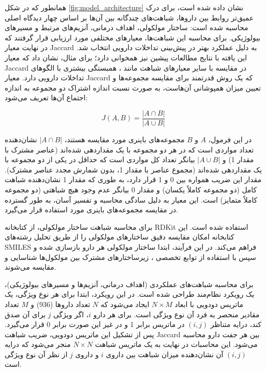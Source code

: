 همانطور که در شکل \ref{fig:model_architecture} نشان داده شده است، برای درک عمیق‌تر روابط بین داروها، شباهت‌های چندگانه بین آن‌ها بر اساس چهار دیدگاه اصلی محاسبه شده است: ساختار مولکولی، اهداف درمانی، آنزیم‌های مرتبط و مسیرهای بیولوژیکی. برای محاسبه این شباهت‌ها، معیارهای مختلفی مورد ارزیابی قرار گرفتند که در نهایت معیار Jaccard به دلیل عملکرد بهتر در پیش‌بینی تداخلات دارویی انتخاب شد. این یافته با نتایج مطالعات پیشین نیز همخوانی دارد؛ برای مثال، \cite{ref_kumari2024} نشان داد که معیار Jaccard در مقایسه با سایر معیارهای شباهت مانند ، همبستگی بیشتری با الگوهای تداخلات دارویی دارد. معیار Jaccard که یک روش قدرتمند برای مقایسه مجموعه‌ها و تعیین میزان همپوشانی آن‌هاست، به صورت نسبت اندازه اشتراک دو مجموعه به اندازه اجتماع آن‌ها تعریف می‌شود:

\begin{equation}
	J(A,B) = \frac{|A \cap B|}{|A \cup B|}
\end{equation}

در این فرمول، $A$ و $B$ مجموعه‌های باینری مورد مقایسه هستند، $|A \cap B|$ نشان‌دهنده تعداد مواردی است که در هر دو مجموعه با یک مقداردهی شده‌اند (عناصر مشترک با مقدار 1) و $|A \cup B|$ بیانگر تعداد کل مواردی است که حداقل در یکی از دو مجموعه با یک مقداردهی شده‌اند (مجموع عناصر با مقدار 1، بدون شمارش مجدد عناصر مشترک). مقدار این ضریب همواره بین 0 و 1 قرار دارد، به طوری که مقدار 1 نشان‌دهنده شباهت کامل (دو مجموعه کاملاً یکسان) و مقدار 0 بیانگر عدم وجود هیچ شباهتی (دو مجموعه کاملاً متمایز) است. این معیار به دلیل سادگی محاسبه و تفسیر آسان، به طور گسترده در مقایسه مجموعه‌های باینری مورد استفاده قرار می‌گیرد.

برای محاسبه شباهت ساختار مولکولی، از کتابخانه RDKit استفاده شده است. این کتابخانه امکان مقایسه دقیق ساختارهای مولکولی را از طریق تحلیل رشته‌های SMILES فراهم می‌کند. در این فرآیند، ابتدا ساختار مولکولی هر دارو بازسازی شده و سپس با استفاده از توابع تخصصی ، زیرساختارهای مشترک بین مولکول‌ها شناسایی و مقایسه می‌شوند.

برای محاسبه شباهت‌های عملکردی (اهداف درمانی، آنزیم‌ها و مسیرهای بیولوژیکی)، یک رویکرد نظام‌مند طراحی شده است. در این رویکرد، ابتدا برای هر نوع ویژگی، یک ماتریس دودویی با ابعاد $N \times M$ ایجاد می‌شود که $N$ تعداد داروها (936) و $M$ تعداد مقادیر منحصر به فرد آن نوع ویژگی است. برای هر دارو $i$، اگر ویژگی $j$ برای آن صدق کند، درایه متناظر $(i,j)$ در ماتریس برابر 1 و در غیر این صورت برابر 0 قرار می‌گیرد. پس از تشکیل این ماتریس دودویی، ضریب شباهت Jaccard بین هر جفت دارو محاسبه می‌شود. این محاسبات در نهایت به یک ماتریس شباهت $N \times N$ منجر می‌شود که درایه $(i,j)$ آن نشان‌دهنده میزان شباهت بین داروی $i$ و داروی $j$ از نظر آن نوع ویژگی است.

